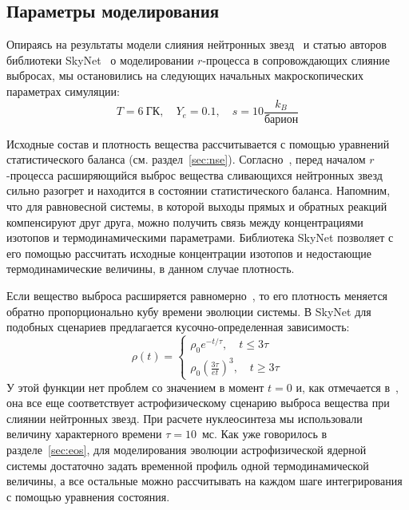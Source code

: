 \subsection{Параметры моделирования}
Опираясь на результаты модели слияния нейтронных звезд~\cite{korobkin2012} и статью авторов библиотеки SkyNet~\cite{lippuner2015} о моделировании $r$-процесса в сопровождающих слияние выбросах, мы остановились на следующих начальных макроскопических параметрах симуляции:
\begin{equation}
\displaystyle
T = 6~\text{ГК},\quad Y_e = 0.1,\quad s = 10 \frac{k_B}{\text{барион}}
\end{equation}

Исходные состав и плотность вещества рассчитывается с помощью уравнений статистического баланса (см. раздел~\ref{sec:nse}). Согласно~\cite{goriely2011,korobkin2012,theilemann2017}, перед началом $r$-процесса расширяющийся выброс вещества сливающихся нейтронных звезд сильно разогрет и находится в состоянии статистического баланса. Напомним, что для равновесной системы, в которой выходы прямых и обратных реакций компенсируют друг друга, можно получить связь между концентрациями изотопов и термодинамическими параметрами. Библиотека SkyNet позволяет с его помощью рассчитать исходные концентрации изотопов и недостающие термодинамические величины, в данном случае плотность.

Если вещество выброса расширяется равномерно~\cite{korobkin2012,lippuner2015}, то его плотность меняется обратно пропорционально кубу времени эволюции системы. В SkyNet для подобных сценариев предлагается кусочно-определенная зависимость:
\begin{equation}
\displaystyle
\rho(t) = \begin{cases}
\rho_0 e^{-t/\tau}, \quad t \leq 3\tau\\
\rho_0 \left( \frac{3\tau}{et} \right)^3, \quad t \geq 3\tau
\end{cases}
\end{equation}
У этой функции нет проблем со значением в момент $t=0$ и, как отмечается в~\cite{lippuner2015}, она все еще соответствует астрофизическому сценарию выброса вещества при слиянии нейтронных звезд. При расчете нуклеосинтеза мы использовали величину характерного времени $\tau = 10$~мс. Как уже говорилось в разделе~\ref{sec:eos}, для моделирования эволюции астрофизической ядерной системы достаточно задать временной профиль одной термодинамической величины, а все остальные можно рассчитывать на каждом шаге интегрирования с помощью уравнения состояния.

